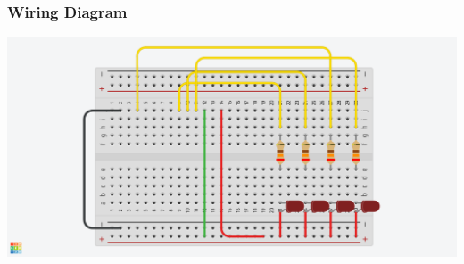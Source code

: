 \documentclass{beamer}
\begin{document}
\begin{frame}
	\frametitle{Wiring Diagram}
	\begin{center}
		\includegraphics[width=\textwidth]{images/breadboard.png}
	\end{center}
\end{frame}
\end{document}
